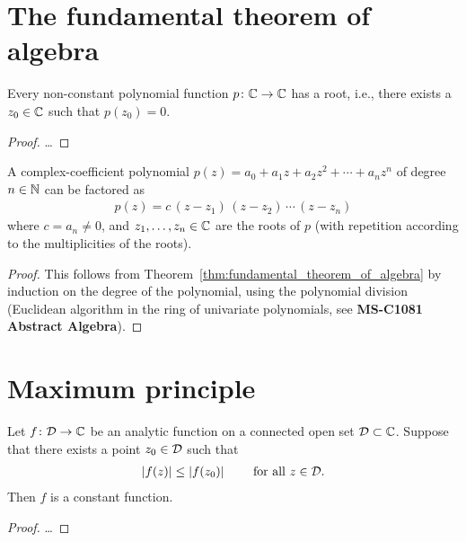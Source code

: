 \section{The fundamental theorem of algebra}

\begin{theorem}
  \label{thm:FUNDAMENTAL_THEOREM_OF_ALGEBRA}
  Every non-constant polynomial function $p \colon \mathbb{C} \to \mathbb{C}$
  has a root, i.e., there exists a $z_0 \in \mathbb{C}$ such that $p(z_0) = 0$.
\end{theorem}
\begin{proof}
  \ldots
\end{proof}

\begin{corollary}
  \label{cor:complex_polynomial_factorization}
  A complex-coefficient
  polynomial $p(z) = a_0 + a_1 z + a_2 z^2 + \cdots + a_n z^n$
  of degree $n \in \mathbb{N}$ can be factored as
  \begin{align*}
    p(z) = c \, (z - z_1) \, (z - z_2) \, \cdots \, (z - z_n)
  \end{align*}
  where $c = a_n \ne 0$, and $z_1 , \ldots, z_n \in \mathbb{C}$
  are the roots of $p$ (with repetition according to the
  multiplicities of the roots).
\end{corollary}
\begin{proof}
  This follows from Theorem~\ref{thm:fundamental_theorem_of_algebra}
  by induction on the degree of the polynomial,
  using the polynomial division (Euclidean algorithm in the
  ring of univariate polynomials, see \textbf{MS-C1081 Abstract Algebra}).
\end{proof}



\section{Maximum principle}

\begin{theorem}
  \label{thm:maximum_principle}
  Let $f \colon \mathcal{D} \to \mathbb{C}$ be an analytic function on a
  connected open set $\mathcal{D} \subset \mathbb{C}$.
  Suppose that there exists a point $z_0 \in \mathcal{D}$
  such that
  \begin{align*}
    |f(z)| \le |f(z_0)| \qquad \text{ for all } z \in \mathcal{D} .
  \end{align*}
  Then $f$ is a constant function.
\end{theorem}
\begin{proof}
  \ldots
\end{proof}

